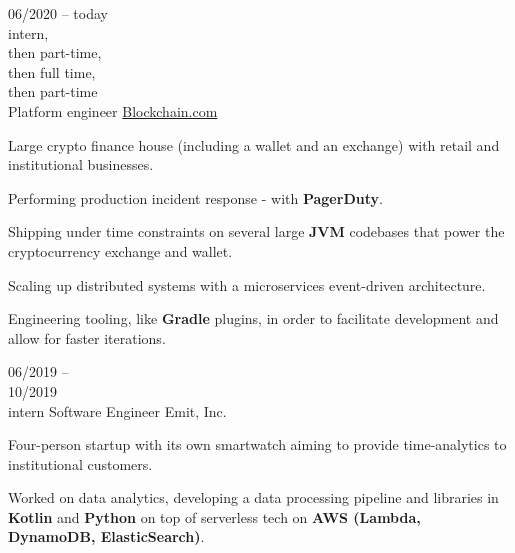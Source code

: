\begin{entrylist}
    \entry
    {
        06/2020 -- today\\\footnotesize{intern,\\then part-time, \\then full time, \\then part-time}\\
    }
    {Platform engineer}
    {\href{https://blockchain.com/about}{Blockchain.com}}
    {
        Large crypto finance house (including a wallet and an exchange) with retail and
    institutional businesses.

    \para
    Performing production incident response - with \textbf{PagerDuty}.

    \para
    Shipping under time constraints on several large \textbf{JVM} codebases that power the
    cryptocurrency exchange and wallet.

    \para
    Scaling up distributed systems with a microservices event-driven architecture.

    \para
    Engineering tooling, like \textbf{Gradle} plugins, in order to facilitate development
    and allow for faster iterations.
    }
    \entry
    {06/2019 -- \\ 10/2019\\\footnotesize{intern}}
    {Software Engineer}
    {Emit, Inc.}
    {
        Four-person startup with its own smartwatch aiming to provide time-analytics to
        institutional customers.

        \para
        Worked on data analytics, developing a data processing pipeline and libraries in
    \textbf{Kotlin} and \textbf{Python} on top of serverless tech on \textbf{AWS (Lambda,
        DynamoDB, ElasticSearch)}.
    }
\end{entrylist}
